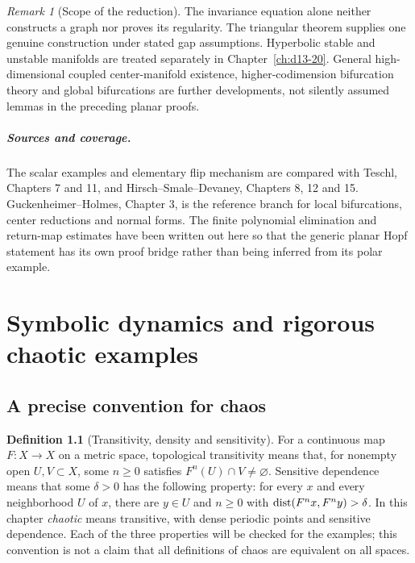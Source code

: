 \documentclass[11pt,oneside]{book}
\theoremstyle{definition}
\newtheorem{definition}[theorem]{Definition}
\theoremstyle{remark}\newtheorem{remark}[theorem]{Remark}
\begin{document}
\begin{remark}[Scope of the reduction]
The invariance equation alone neither constructs a graph nor proves its
regularity. The triangular theorem supplies one genuine construction
under stated gap assumptions. Hyperbolic stable and unstable manifolds
are treated separately in Chapter~\ref{ch:d13-20}. General high-dimensional
coupled center-manifold existence, higher-codimension bifurcation theory
and global bifurcations are further developments, not silently assumed
lemmas in the preceding planar proofs.
\end{remark}

\paragraph{Sources and coverage.}
The scalar examples and elementary flip mechanism are compared with
Teschl, Chapters 7 and 11, and Hirsch--Smale--Devaney, Chapters 8, 12
and 15. Guckenheimer--Holmes, Chapter 3, is the reference branch for
local bifurcations, center reductions and normal forms. The finite
polynomial elimination and return-map estimates have been written
out here so that the generic planar Hopf statement has its own
proof bridge rather than being inferred from its polar example.



\chapter{Symbolic dynamics and rigorous chaotic examples}\label{ch:d13-17}

\section{A precise convention for chaos}

\begin{definition}[Transitivity, density and sensitivity]\label{d13:17:chaos-definition}
For a continuous map \(F:X\to X\) on a metric space, topological
transitivity means that, for nonempty open \(U,V\subset X\), some
\(n\geq0\) satisfies \(F^n(U)\cap V\neq\varnothing\).
Sensitive dependence means that some \(\delta>0\) has the following
property: for every \(x\) and every neighborhood \(U\) of \(x\), there
are \(y\in U\) and \(n\geq0\) with
\(\operatorname{dist}(F^nx,F^ny)>\delta\).
In this chapter \emph{chaotic} means transitive, with dense periodic
points and sensitive dependence. Each of the three properties will
be checked for the examples; this convention is not a claim that
all definitions of chaos are equivalent on all spaces.
\end{definition}
\end{document}
